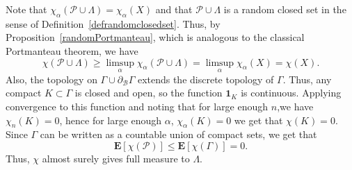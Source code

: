 \documentclass{amsart}
\theoremstyle{definition}
\theoremstyle{remark}
\begin{document}
Note that $\chi_{\alpha}(\mathcal{P}\cup \Lambda)=\chi_{\alpha}(X)$ and that $\mathcal{P}\cup \Lambda$ is a random closed set in the sense of Definition~\ref{defrandomclosedset}.
Thus, by Proposition~\ref{randomPortmanteau}, which is analogous to the classical Portmanteau theorem, we have
$$\chi(\mathcal{P}\cup \Lambda)\geq \limsup_{\alpha}\chi_{\alpha}(\mathcal{P}\cup \Lambda)=\limsup_\alpha\chi_{\alpha}(X)=\chi(X).$$
Also, the topology on $\Gamma \cup \partial_{\mathcal{B}}\Gamma$ extends the discrete topology of $\Gamma$.
Thus, any compact $K\subset \Gamma$ is closed and open, so the function $\mathbf 1_K$ is continuous.
Applying convergence to this function and noting that for large enough $n$,we have $\chi_{n}(K)=0$, hence for large enough $\alpha$, $\chi_\alpha(K)=0$ we get that
$\chi(K)=0$.
Since $\Gamma$ can be written as a countable union of compact sets, we get that
$$\mathbf E[\chi(\mathcal{P})]\leq \mathbf E[\chi(\Gamma)]=0.$$
Thus, $\chi$ almost surely gives full measure to $\Lambda$.
\end{document}

